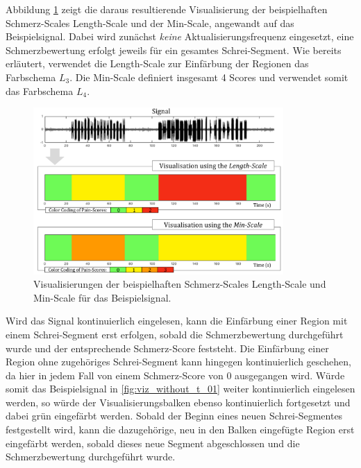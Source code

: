 Abbildung \ref{fig:viz_without_t_01} zeigt die daraus resultierende Visualisierung der beispielhaften Schmerz-Scales Length-Scale und der Min-Scale, angewandt auf das Beispielsignal. Dabei wird zunächst \emph{keine} Aktualisierungsfrequenz eingesetzt, eine Schmerzbewertung erfolgt jeweils für ein gesamtes Schrei-Segment. Wie bereits erläutert, verwendet die Length-Scale zur Einfärbung der Regionen das Farbschema $L_3$. Die Min-Scale definiert insgesamt 4 Scores und verwendet somit das Farbschema $L_4$.

\begin{figure}[h]
	\centering
	\includegraphics[width=0.85\textwidth]{bilder/viz_without_t_06.png}
	\caption[Visualisierungen der beispielhaften Schmerz-Scales durch schematische Balken]{Visualisierungen der beispielhaften Schmerz-Scales Length-Scale und Min-Scale für das Beispielsignal.}
	\label{fig:viz_without_t_01}
\end{figure}

Wird das Signal kontinuierlich eingelesen, kann die Einfärbung einer Region mit einem Schrei-Segment erst erfolgen, sobald die Schmerzbewertung durchgeführt wurde und der entsprechende Schmerz-Score feststeht. Die Einfärbung einer Region ohne zugehöriges Schrei-Segment kann hingegen kontinuierlich geschehen, da hier in jedem Fall von einem Schmerz-Score von 0 ausgegangen wird. Würde somit das Beispielsignal in \autoref{fig:viz_without_t_01} weiter kontinuierlich eingelesen werden, so würde der Visualisierungsbalken ebenso kontinuierlich fortgesetzt und dabei grün eingefärbt werden. Sobald der Beginn eines neuen Schrei-Segmentes festgestellt wird, kann die dazugehörige, neu in den Balken eingefügte Region erst eingefärbt werden, sobald dieses neue Segment abgeschlossen und die Schmerzbewertung durchgeführt wurde.

